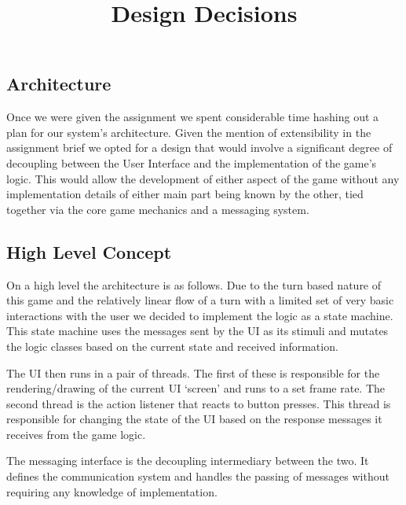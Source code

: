 \documentclass[a4paper, 11pt]{article}
\title{Design Decisions}
\begin{document}
	\maketitle
	\subsection*{Architecture}
	Once we were given the assignment we spent considerable time hashing out a plan for our system's architecture. Given the mention of extensibility in the assignment brief we opted for a design that would involve a significant degree of decoupling between the User Interface and the implementation of the game's logic. This would allow the development of either aspect of the game without any implementation details of either main part being known by the other, tied together via the core game mechanics and a messaging system.
	\subsection*{High Level Concept}
	On a high level the architecture is as follows. Due to the turn based nature of this game and the relatively linear flow of a turn with a limited set of very basic interactions with the user we decided to implement the logic as a state machine. This state machine uses the messages sent by the UI as its stimuli and mutates the logic classes based on the current state and received information.\par 
	\noindent The UI then runs in a pair of threads. The first of these is responsible for the rendering/drawing of the current UI `screen' and runs to a set frame rate. The second thread is the action listener that reacts to button presses. This thread is responsible for changing the state of the UI based on the response messages it receives from the game logic.\par 
	\noindent The messaging interface is the decoupling intermediary between the two. It defines the communication system and handles the passing of messages without requiring any knowledge of implementation.
	
\end{document}
